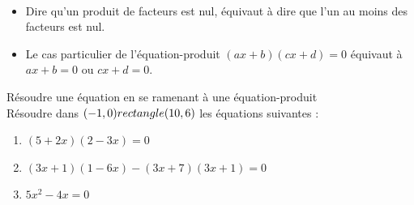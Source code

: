 \begin{Propriété} $ $\\
\vspace{-0.5cm}
\begin{itemize}[label=\textcolor{Couleur2}{$\bullet$}]
\item Dire qu'un produit de facteurs est nul, équivaut à dire que l'un au moins des facteurs est nul.
\item Le cas particulier de l'équation-produit $(ax + b)(cx + d) = 0$ équivaut à $ax+b=0$ ou $cx+d=0$.
\end{itemize}
\end{Propriété}



\begin{Méthode}Résoudre une équation en se ramenant à une équation-produit \\
Résoudre dans $(-1,0) rectangle (10,6)$ les équations suivantes : 

\begin{enumerate}

\item $(5 + 2x)(2 - 3x)=0$ 
\item $(3x+1)(1-6x)-(3x+7)(3x+1)=0$
\item $ 5x^2-4x=0$

\end{enumerate}
\vspace{0.1cm}

\ligne

\ligne

\ligne

\ligne

\ligne

\ligne

\ligne

\ligne

\ligne

\ligne

\ligne

\ligne

\ligne

\ligne

\ligne

\ligne

\ligne

\ligne

\ligne

\ligne

\ligne

\ligne

\ligne

\ligne

\ligne

\end{Méthode}

